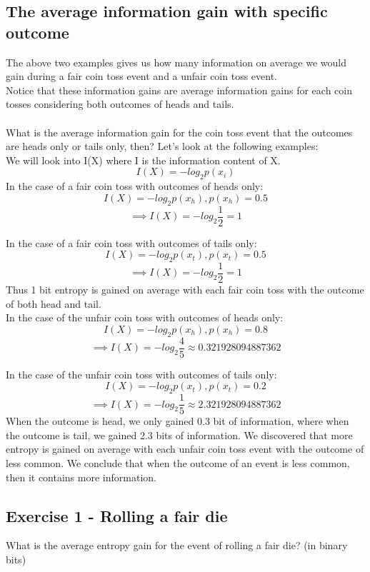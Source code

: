 \documentclass[12pt]{article}
\begin{document}
\subsection{The average information gain with specific outcome}
The above two examples gives us how many information on average we would gain during a fair coin toss event and a unfair coin toss event.\\
Notice that these information gains are average information gains for each coin tosses considering both outcomes of heads and tails.\\\\
What is the average information gain for the coin toss event that the outcomes are heads only or tails only, then? Let's look at the following examples:\\
We will look into I(X) where I is the information content of X.\\
\[
	I(X) = - log_2 p(x_i)
\]
In the case of a fair coin toss with outcomes of heads only:
\[
	I(X) = - log_2 p(x_h), p(x_h) = 0.5
\]
\[
\implies
	I(X) = - log_2 \frac{1}{2} = 1 
\]

In the case of a fair coin toss with outcomes of tails only:
\[
	I(X) = - log_2 p(x_t), p(x_t) = 0.5
\]
\[
\implies
	I(X) = - log_2 \frac{1}{2} = 1 
\]
Thus 1 bit entropy is gained on average with each fair coin toss with the outcome of both head and tail.\\

In the case of the unfair coin toss with outcomes of heads only:
\[
	I(X) = - log_2 p(x_h), p(x_h) = 0.8
\]
\[
\implies
	I(X) = - log_2 \frac{4}{5} \approx 0.321928094887362 
\]

In the case of the unfair coin toss with outcomes of tails only:
\[
	I(X) = - log_2 p(x_t), p(x_t) = 0.2
\]
\[
\implies
	I(X) = - log_2 \frac{1}{5} \approx 2.321928094887362 
\]
When the outcome is head, we only gained 0.3 bit of information, where when the outcome is tail, we gained 2.3 bits of information. We discovered that more entropy is gained on average with each unfair coin toss event with the outcome of less common. We conclude that when the outcome of an event is less common, then it contains more information.

\subsection{Exercise 1 - Rolling a fair die }
What is the average entropy gain for the event of rolling a fair die? (in binary bits)
\end{document}
